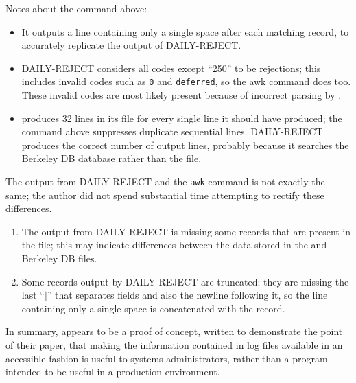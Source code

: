 Notes about the command above:

\begin{itemize}

    \item It outputs a line containing only a single space after each
        matching record, to accurately replicate the output of
        DAILY-REJECT\@.

    \item DAILY-REJECT considers all  codes except ``250'' to
        be rejections; this includes invalid  codes such as
        \texttt{0} and \texttt{deferred}, so the awk command does too.
        These invalid  codes are most likely present because
        of incorrect parsing by .

    \item {} produces 32 lines in its  file for
        every single line it should have produced; the command above
        suppresses duplicate sequential lines.  DAILY-REJECT produces the
        correct number of output lines, probably because it searches the
        Berkeley DB database rather than the  file.

\end{itemize}

The output from DAILY-REJECT and the \texttt{awk} command is not exactly
the same; the author did not spend substantial time attempting to rectify
these differences.

\begin{enumerate}

    \item The output from DAILY-REJECT is missing some records that are
        present in the  file; this may indicate differences
        between the data stored in the  and Berkeley DB files.

    \item Some records output by DAILY-REJECT are truncated: they are
        missing the last ``$|$'' that separates fields and also the newline
        following it, so the line containing only a single space is
        concatenated with the record.

\end{enumerate}

In summary,  appears to be a proof of concept, written to
demonstrate the point of their paper, that making the information contained
in log files available in an accessible fashion is useful to systems
administrators, rather than a program intended to be useful in a production
environment.


